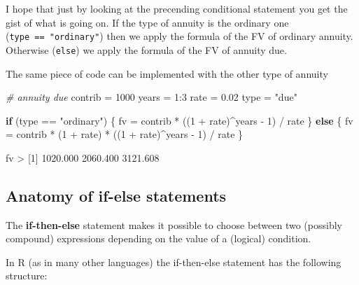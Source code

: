 \documentclass[
]{book}
\newenvironment{Shaded}{\begin{snugshade}}{\end{snugshade}}
\newcommand{\CommentTok}[1]{\textcolor[rgb]{0.56,0.35,0.01}{\textit{#1}}}
\newcommand{\ControlFlowTok}[1]{\textcolor[rgb]{0.13,0.29,0.53}{\textbf{#1}}}
\newcommand{\DecValTok}[1]{\textcolor[rgb]{0.00,0.00,0.81}{#1}}
\newcommand{\FloatTok}[1]{\textcolor[rgb]{0.00,0.00,0.81}{#1}}
\newcommand{\NormalTok}[1]{#1}
\newcommand{\OtherTok}[1]{\textcolor[rgb]{0.56,0.35,0.01}{#1}}
\newcommand{\SpecialCharTok}[1]{\textcolor[rgb]{0.00,0.00,0.00}{#1}}
\newcommand{\StringTok}[1]{\textcolor[rgb]{0.31,0.60,0.02}{#1}}
\begin{document}
I hope that just by looking at the precending conditional statement you get
the gist of what is going on. If the type of annuity is the ordinary one
(\texttt{type\ ==\ "ordinary"}) then we apply the formula of the FV of ordinary annuity.
Otherwise (\texttt{else}) we apply the formula of the FV of annuity due.

The same piece of code can be implemented with the other type of annuity

\begin{Shaded}
\begin{Highlighting}[]
\CommentTok{\# annuity due}
\NormalTok{contrib }\OtherTok{=} \DecValTok{1000}
\NormalTok{years }\OtherTok{=} \DecValTok{1}\SpecialCharTok{:}\DecValTok{3}
\NormalTok{rate }\OtherTok{=} \FloatTok{0.02}
\NormalTok{type }\OtherTok{=} \StringTok{"due"}
  
\ControlFlowTok{if}\NormalTok{ (type }\SpecialCharTok{==} \StringTok{"ordinary"}\NormalTok{) \{}
\NormalTok{  fv }\OtherTok{=}\NormalTok{ contrib }\SpecialCharTok{*}\NormalTok{ ((}\DecValTok{1} \SpecialCharTok{+}\NormalTok{ rate)}\SpecialCharTok{\^{}}\NormalTok{years }\SpecialCharTok{{-}} \DecValTok{1}\NormalTok{) }\SpecialCharTok{/}\NormalTok{ rate}
\NormalTok{\} }\ControlFlowTok{else}\NormalTok{ \{}
\NormalTok{  fv }\OtherTok{=}\NormalTok{ contrib }\SpecialCharTok{*}\NormalTok{ (}\DecValTok{1} \SpecialCharTok{+}\NormalTok{ rate) }\SpecialCharTok{*}\NormalTok{ ((}\DecValTok{1} \SpecialCharTok{+}\NormalTok{ rate)}\SpecialCharTok{\^{}}\NormalTok{years }\SpecialCharTok{{-}} \DecValTok{1}\NormalTok{) }\SpecialCharTok{/}\NormalTok{ rate}
\NormalTok{\}}

\NormalTok{fv}
\SpecialCharTok{\textgreater{}}\NormalTok{ [}\DecValTok{1}\NormalTok{] }\FloatTok{1020.000} \FloatTok{2060.400} \FloatTok{3121.608}
\end{Highlighting}
\end{Shaded}

\hypertarget{anatomy-of-if-else-statements}{%
\subsection{Anatomy of if-else statements}\label{anatomy-of-if-else-statements}}

The \textbf{if-then-else} statement makes it possible to choose between two
(possibly compound) expressions depending on the value of a (logical) condition.

In R (as in many other languages) the if-then-else statement has the following
structure:
\end{document}
